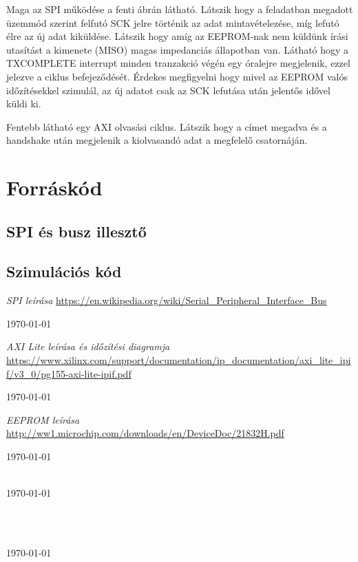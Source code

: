 \documentclass[a4paper,11pt]{article}
\begin{document}
Maga az SPI működése a fenti ábrán látható. Látszik hogy a feladatban megadott üzemmód szerint felfutó SCK jelre történik az adat mintavételezése, míg lefutó élre az új adat kiküldése. Látszik hogy amíg az EEPROM-nak nem küldünk írási utasítást a kimenete (MISO) magas impedanciás állapotban van. Látható hogy a TXCOMPLETE interrupt minden tranzakció végén egy óralejre megjelenik, ezzel jelezve a ciklus befejeződését. Érdekes megfigyelni hogy mivel az EEPROM valós időzítésekkel szimulál, az új adatot csak az SCK lefutása után jelentős idővel küldi ki.

Fentebb látható egy AXI olvasási ciklus. Látszik hogy a címet megadva és a handshake után megjelenik a kiolvasandó adat a megfelelő csatornáján.

\section{Forráskód}

\subsection{SPI és busz illesztő}

\subsection{Szimulációs kód}


\pagebreak
\begin{thebibliography}{}


\textit{SPI leírása}
\url{https://en.wikipedia.org/wiki/Serial_Peripheral_Interface_Bus}

\today


\textit{AXI Lite leírása és időzítési diagramja}\\
\url{https://www.xilinx.com/support/documentation/ip_documentation/axi_lite_ipif/v3_0/pg155-axi-lite-ipif.pdf}

\today


\textit{EEPROM leírása}\\
\url{http://ww1.microchip.com/downloads/en/DeviceDoc/21832H.pdf}

\today


\textit{}\\
\url{}
\today


\textit{}\\



\textit{}\\
\url{}
\today


\end{thebibliography}
\end{document}
